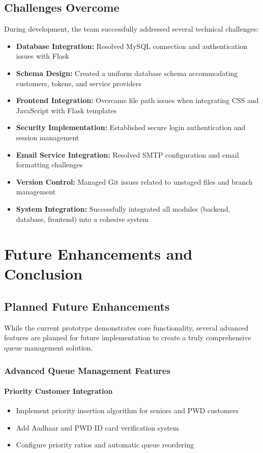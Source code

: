 \documentclass[12pt,a4paper]{report}
\begin{document}
\section{Challenges Overcome}

During development, the team successfully addressed several technical challenges:

\begin{itemize}
    \item \textbf{Database Integration:} Resolved MySQL connection and authentication issues with Flask
    \item \textbf{Schema Design:} Created a uniform database schema accommodating customers, tokens, and service providers
    \item \textbf{Frontend Integration:} Overcame file path issues when integrating CSS and JavaScript with Flask templates
    \item \textbf{Security Implementation:} Established secure login authentication and session management
    \item \textbf{Email Service Integration:} Resolved SMTP configuration and email formatting challenges
    \item \textbf{Version Control:} Managed Git issues related to unstaged files and branch management
    \item \textbf{System Integration:} Successfully integrated all modules (backend, database, frontend) into a cohesive system
\end{itemize}

\newpage
\chapter{Future Enhancements and Conclusion}

\section{Planned Future Enhancements}

While the current prototype demonstrates core functionality, several advanced features are planned for future implementation to create a truly comprehensive queue management solution.

\subsection{Advanced Queue Management Features}

\subsubsection{Priority Customer Integration}
\begin{itemize}
    \item Implement priority insertion algorithm for seniors and PWD customers
    \item Add Aadhaar and PWD ID card verification system
    \item Configure priority ratios and automatic queue reordering
\end{itemize}
\end{document}
